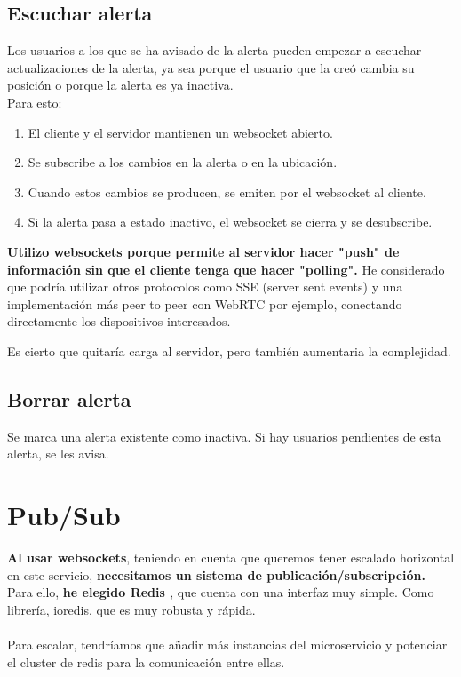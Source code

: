 \subsection{Escuchar alerta}\label{subsec:websocket}
Los usuarios a los que se ha avisado de la alerta pueden empezar a escuchar actualizaciones de la alerta,
ya sea porque el usuario que la creó cambia su posición o porque la alerta es ya inactiva. \\
Para esto:
\begin{enumerate}
	\item El cliente y el servidor mantienen un websocket abierto.
	\item Se subscribe a los cambios en la alerta o en la ubicación.
	\item Cuando estos cambios se producen, se emiten por el websocket al cliente.
	\item Si la alerta pasa a estado inactivo, el websocket se cierra y se desubscribe.
\end{enumerate}
\textbf{Utilizo websockets porque permite al servidor hacer "push" de información sin que el cliente tenga que hacer "polling".}
He considerado que podría utilizar otros protocolos como SSE (server sent events) y una implementación más peer to peer con WebRTC por ejemplo, conectando directamente los dispositivos interesados.

Es cierto que quitaría carga al servidor, pero también aumentaria la complejidad.

\subsection{Borrar alerta}
Se marca una alerta existente como inactiva. Si hay usuarios pendientes de esta alerta, se les avisa.


\section{Pub/Sub}\label{sec:pubsub}
\textbf{Al usar websockets}, teniendo en cuenta que queremos tener escalado horizontal en este servicio,
\textbf{necesitamos un sistema de publicación/subscripción.} \\
Para ello, \textbf{he elegido Redis \cite{redis}}, que cuenta con una interfaz muy simple. Como librería, ioredis, 
que es muy robusta y rápida.\\ \\

Para escalar, tendríamos que añadir más instancias del microservicio y potenciar el cluster de redis para la comunicación entre ellas.

